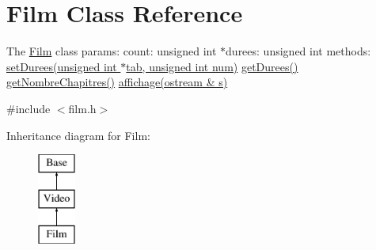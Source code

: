 \hypertarget{classFilm}{\section{Film Class Reference}
\label{classFilm}
}


The \hyperlink{classFilm}{Film} class params\-: count\-: unsigned int $\ast$durees\-: unsigned int methods\-: \hyperlink{classFilm_acf9c4384117b17333e434d410914d48b}{set\-Durees(unsigned int $\ast$tab, unsigned int num)} \hyperlink{classFilm_a2beb91b3aa53d2b1f25e43783585aaf0}{get\-Durees()} \hyperlink{classFilm_a094ff01cf9629b9ec0bed4e6efd140d3}{get\-Nombre\-Chapitres()} \hyperlink{classFilm_a0fd2b4ba12627d9268fb0ee64b850b15}{affichage(ostream \& s)}  




{\ttfamily \#include $<$film.\-h$>$}

Inheritance diagram for Film\-:\begin{figure}[H]
\begin{center}
\leavevmode
\includegraphics[height=3.000000cm]{classFilm}
\end{center}
\end{figure}
